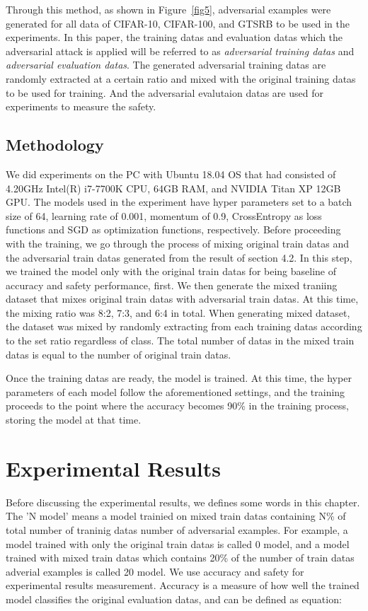 \documentclass[journal,article,submit,moreauthors,pdftex]{Definitions/mdpi}
\begin{document}
Through this method, as shown in Figure~\ref{fig5}, adversarial examples were generated for all data of CIFAR-10, CIFAR-100, and GTSRB to be used in the experiments.
In this paper, the training datas and evaluation datas which the adversarial attack is applied will be referred to as {\it adversarial training datas} and {\it adversarial evaluation datas}.
The generated adversarial training datas are randomly extracted at a certain ratio and mixed with the original training datas to be used for training. And the adversarial evalutaion datas are used for experiments to measure the safety.

\subsection{Methodology}

We did experiments on the PC with Ubuntu 18.04 OS that had consisted of 4.20GHz Intel(R) i7-7700K CPU, 64GB RAM, and NVIDIA Titan XP 12GB GPU. The models used in the experiment have hyper parameters set to a batch size of 64, learning rate of 0.001, momentum of 0.9, CrossEntropy as loss functions and SGD as optimization functions, respectively.
Before proceeding with the training, we go through the process of mixing original train datas and the adversarial train datas generated from the result of section 4.2.
In this step, we trained the model only with the original train datas for being baseline of accuracy and safety performance, first. We then generate the mixed traniing dataset that mixes original train datas with adversarial train datas.
At this time, the mixing ratio was 8:2, 7:3, and 6:4 in total. When generating mixed dataset, the dataset was mixed by randomly extracting from each training datas according to the set ratio regardless of class.
The total number of datas in the mixed train datas is equal to the number of original train datas.

Once the training datas are ready, the model is trained. At this time, the hyper parameters of each model follow the aforementioned settings, and the training proceeds to the point where the accuracy becomes 90\% in the training process, storing the model at that time.

\section{Experimental Results}

Before discussing the experimental results, we defines some words in this chapter. The 'N model' means a model trainied on mixed train datas containing N\% of total number of traninig datas number of adversarial examples.
For example, a model trained with only the original train datas is called 0 model, and a model trained with mixed train datas which contains 20\% of the number of train datas adverial examples is called 20 model.
We use accuracy and safety for experimental results measurement. Accuracy is a measure of how well the trained model classifies the original evaluation datas, and can be defined as equation:
\end{document}
